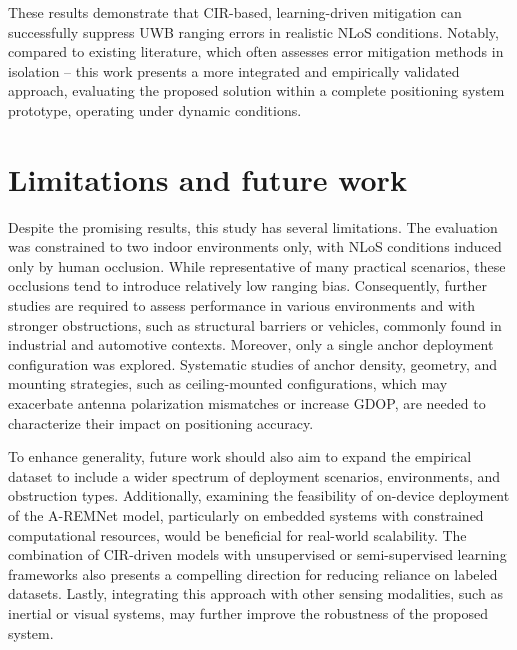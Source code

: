 These results demonstrate that CIR-based, learning-driven mitigation can successfully suppress UWB ranging errors in realistic NLoS conditions. Notably, compared to existing literature, which often assesses error mitigation methods in isolation -- this work presents a more integrated and empirically validated approach, evaluating the proposed solution within a complete positioning system prototype, operating under dynamic conditions.

\section{Limitations and future work}

Despite the promising results, this study has several limitations. The evaluation was constrained to two indoor environments only, with NLoS conditions induced only by human occlusion. While representative of many practical scenarios, these occlusions tend to introduce relatively low ranging bias. Consequently, further studies are required to assess performance in various environments and with stronger obstructions, such as structural barriers or vehicles, commonly found in industrial and automotive contexts. Moreover, only a single anchor deployment configuration was explored. Systematic studies of anchor density, geometry, and mounting strategies, such as ceiling-mounted configurations, which may exacerbate antenna polarization mismatches or increase GDOP, are needed to characterize their impact on positioning accuracy.

To enhance generality, future work should also aim to expand the empirical dataset to include a wider spectrum of deployment scenarios, environments, and obstruction types. Additionally, examining the feasibility of on-device deployment of the A-REMNet model, particularly on embedded systems with constrained computational resources, would be beneficial for real-world scalability. The combination of CIR-driven models with unsupervised or semi-supervised learning frameworks also presents a compelling direction for reducing reliance on labeled datasets. Lastly, integrating this approach with other sensing modalities, such as inertial or visual systems, may further improve the robustness of the proposed system.
